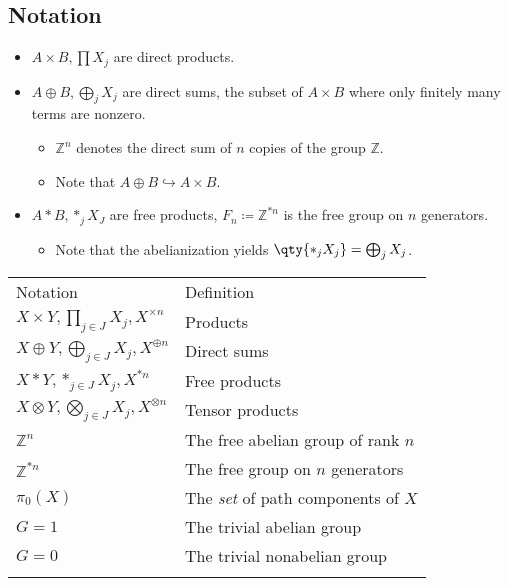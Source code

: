 \hypertarget{notation}{%
\subsection{Notation}\label{notation}}

\begin{itemize}
\item
  \(A\times B, \prod X_j\) are direct products.
\item
  \(A\oplus B, \bigoplus_j X_j\) are direct sums, the subset of
  \(A\times B\) where only finitely many terms are nonzero.

  \begin{itemize}
  \tightlist
  \item
    \({{\mathbb{Z}}}^n\) denotes the direct sum of \(n\) copies of the
    group \({{\mathbb{Z}}}\).
  \item
    Note that \(A \oplus B \hookrightarrow A\times B\).
  \end{itemize}
\item
  \(A\ast B, \ast_j X_J\) are free products,
  \(F_n \coloneqq{\mathbb{Z}}^{\ast n}\) is the free group on \(n\)
  generators.

  \begin{itemize}
  \tightlist
  \item
    Note that the abelianization yields
    \(\qty{\ast_j X_j} = \bigoplus_j X_j\).
  \end{itemize}
\end{itemize}

\begin{longtable}[]{@{}ll@{}}
\toprule
Notation & Definition \\ \addlinespace
\midrule
\endhead
\(X\times Y, \prod_{j\in J} X_j, X^{\times n}\) &
Products \\ \addlinespace
\(X\oplus Y, \bigoplus_{j\in J} X_j, X^{\oplus n}\) & Direct
sums \\ \addlinespace
\(X\ast Y, \ast_{j\in J} X_j, X^{\ast n}\) & Free
products \\ \addlinespace
\(X\otimes Y, \bigotimes_{j\in J} X_j, X^{\otimes n}\) & Tensor
products \\ \addlinespace
\({\mathbb{Z}}^n\) & The free abelian group of rank
\(n\) \\ \addlinespace
\({\mathbb{Z}}^{\ast n}\) & The free group on \(n\)
generators \\ \addlinespace
\(\pi_0(X)\) & The \emph{set} of path components of
\(X\) \\ \addlinespace
\(G=1\) & The trivial abelian group \\ \addlinespace
\(G=0\) & The trivial nonabelian group \\ \addlinespace
\bottomrule
\end{longtable}

